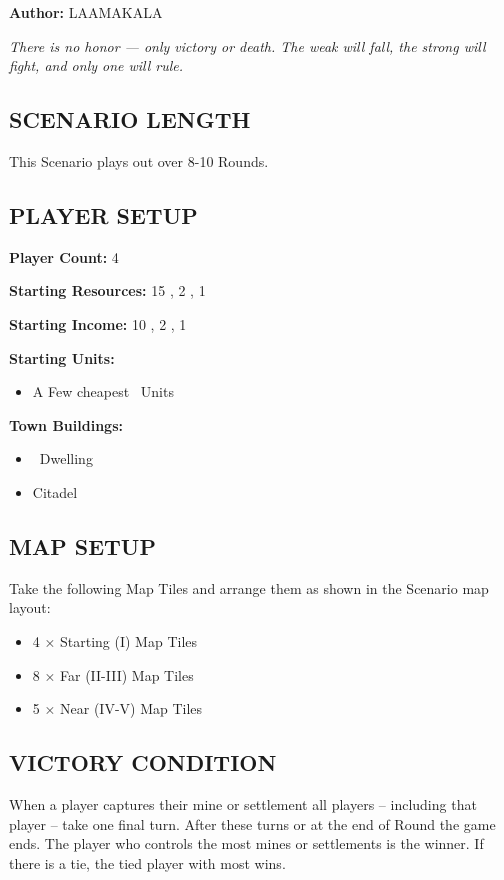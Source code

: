 
\begin{multicols*}{2}

\textbf{Author:} LAAMAKALA

\textit{There is no honor — only victory or death. The weak will fall, the strong will fight, and only one will rule.}

\subsection*{\MakeUppercase{Scenario Length}}
This Scenario plays out over 8-10 Rounds.

\subsection*{\MakeUppercase{Player Setup}}
\textbf{Player Count:} 4

\textbf{Starting Resources:} 15 , 2 , 1 

\textbf{Starting Income:} 10 , 2 , 1 

\textbf{Starting Units:}
\begin{itemize}
  \item A Few cheapest \silver\ Units
\end{itemize}

\textbf{Town Buildings:}
\begin{itemize}
  \item \bronze\ Dwelling
  \item Citadel
\end{itemize}

\subsection*{\MakeUppercase{Map Setup}}
Take the following Map Tiles and arrange them as shown in the Scenario map layout:

\begin{itemize}
  \item 4 × Starting (I) Map Tiles
  \item 8 × Far (II-III) Map Tiles
  \item 5 × Near (IV-V) Map Tiles
\end{itemize}

\subsection*{\MakeUppercase{Victory Condition}}
When a player captures their  mine or settlement all players -- including that player -- take one final turn. After these turns or at the end of  Round the game ends. The player who controls the most mines or settlements is the winner. If there is a tie, the tied player with most  wins.


\end{multicols*}
